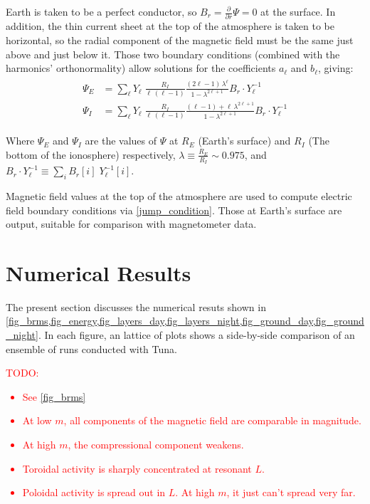 \documentclass{article}
\newcommand{\todo}[1]{ \textcolor{red}{TODO: #1} }
\newcommand{\dd}[1]{\ensuremath{ \frac{\partial}{\partial #1} }\xspace}
\newcommand{\lr}[1]{ \left( #1 \right) }
\newcommand{\azm}{\ensuremath{m}\xspace}
\begin{document}
Earth is taken to be a perfect conductor, so $B_r = \dd{r} \Psi = 0$ at the surface. In addition, the thin current sheet at the top of the atmosphere is taken to be horizontal, so the radial component of the magnetic field must be the same just above and just below it. Those two boundary conditions (combined with the harmonics' orthonormality) allow solutions for the coefficients $a_\ell$ and $b_\ell$, giving:
\begin{align}
  \label{psi_final}
  \begin{split}
  \Psi_E &= \displaystyle\sum_\ell Y_\ell \; \frac{R_I}{ \ell \, \lr{\ell - 1} } \frac{ \lr{2 \ell - 1} \, \lambda^\ell }{ 1 - \lambda^{2 \ell + 1} } B_r \cdot Y_\ell^{-1} \\
  \Psi_I &= \displaystyle\sum_\ell Y_\ell \; \frac{R_I}{ \ell \, \lr{\ell - 1} } \frac{ \lr{\ell - 1} + \ell \, \lambda^{2 \ell + 1} }{ 1 - \lambda^{2 \ell + 1} } B_r \cdot Y_\ell^{-1}
  \end{split}
\end{align}

Where $\Psi_E$ and $\Psi_I$ are the values of $\Psi$ at $R_E$ (Earth's surface) and $R_I$ (The bottom of the ionosphere) respectively, $\lambda \equiv \frac{R_E}{R_I} \sim \num{0.975}$, and $B_r \cdot Y_\ell^{-1} \equiv \displaystyle\sum_i B_r [i] \; Y_\ell^{-1} \! [i]$.

Magnetic field values at the top of the atmosphere are used to compute electric field boundary conditions via \cref{jump_condition}. Those at Earth's surface are output, suitable for comparison with magnetometer data.


\section{Numerical Results}

The present section discusses the numerical resuts shown in \cref{fig_brms,fig_energy,fig_layers_day,fig_layers_night,fig_ground_day,fig_ground_night}. In each figure, an lattice of plots shows a side-by-side comparison of an ensemble of runs conducted with Tuna.

\todo{
\begin{itemize}
    \item See \cref{fig_brms}
    \item At low \azm, all components of the magnetic field are comparable in magnitude.
    \item At high \azm, the compressional component weakens.
    \item Toroidal activity is sharply concentrated at resonant $L$.
    \item Poloidal activity is spread out in $L$. At high \azm, it just can't spread very far.
\end{itemize}
}
\end{document}
